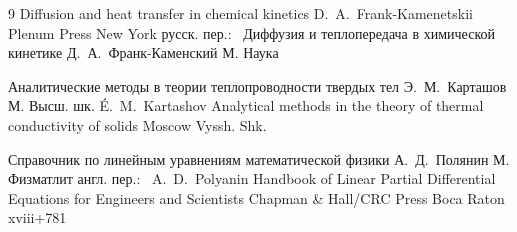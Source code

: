 \begin{thebibliography}{9}
\book Diffusion and heat transfer in chemical kinetics
\by D.~A.~Frank-Kamenetskii 
\publ Plenum Press
\publaddr New York
\rtransl русск. пер.:~
\book Диффузия и теплопередача в химической кинетике 
\by Д.~А.~Франк-Каменский
\publaddr М.
\publ Наука


\book Аналитические методы в теории теплопроводности твердых тел 
\by  Э.~М.~Карташов
\publaddr М. 
\publ Высш. шк.
\misctransl
\by \'E.~M.~Kartashov
\book Analytical methods in the theory of thermal conductivity of solids
\publaddr Moscow
\publ Vyssh. Shk.


\book Справочник по линейным уравнениям математической физики 
\by А.~Д.~Полянин
\publaddr М.
\publ  Физматлит
\transl англ. пер.:~
\by  A.~D.~Polyanin
\book Handbook of Linear Partial Differential Equations for Engineers and Scientists
\publ Chapman \& Hall/CRC Press
\publaddr Boca Raton
\totalpages xviii+781


\end{thebibliography}


\noindent
\hskip6.5cm \thedate \par\noindent
\hskip6.5cm\therevdate

\vspace{-10mm}
%

\makeengtitle



\newpage
%
%
%
